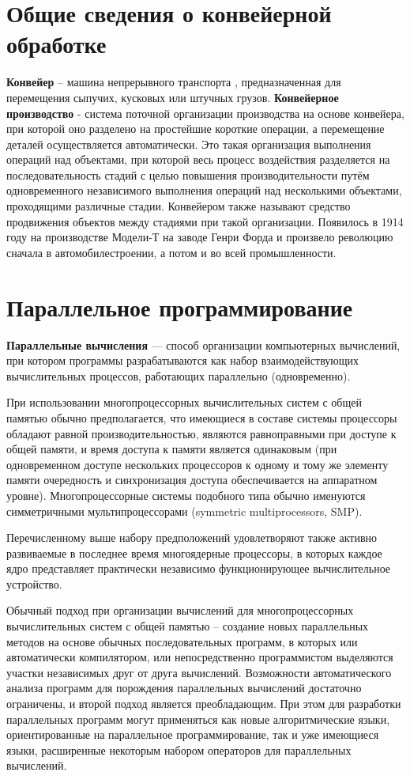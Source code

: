 \documentclass[12pt]{report}
\begin{document}
\section{Общие сведения о конвейерной обработке}
\par
\textbf{Конвейер} – машина непрерывного транспорта \cite{mednov}, предназначенная для перемещения сыпучих, кусковых или штучных грузов.
\newline
\textbf{Конвейерное производство} - система поточной организации производства на основе конвейера, при которой оно разделено на простейшие короткие операции, а перемещение деталей осуществляется автоматически. Это такая организация выполнения операций над объектами, при которой весь процесс воздействия разделяется на последовательность стадий с целью повышения производительности путём одновременного независимого выполнения операций над несколькими объектами, проходящими различные стадии. Конвейером также называют средство продвижения объектов между стадиями при такой организации\cite{wiki}. Появилось в 1914 году на производстве Модели-Т на заводе Генри Форда\cite{ford} и произвело революцию сначала в автомобилестроении, а потом и во всей промышленности.

\section{Параллельное программирование}
\textbf{Параллельные вычисления} — способ организации компьютерных вычислений, при котором программы разрабатываются как набор взаимодействующих вычислительных процессов, работающих параллельно (одновременно). 

При использовании многопроцессорных вычислительных систем с общей памятью обычно предполагается, что имеющиеся в составе системы процессоры обладают равной производительностью, являются равноправными при доступе к общей памяти, и время доступа к памяти является одинаковым (при одновременном доступе нескольких процессоров к одному и тому же элементу памяти очередность и синхронизация доступа обеспечивается на аппаратном уровне). Многопроцессорные системы подобного типа обычно именуются симметричными мультипроцессорами (symmetric multiprocessors, SMP).

Перечисленному выше набору предположений удовлетворяют также активно развиваемые в последнее время многоядерные процессоры, в которых каждое ядро представляет практически независимо функционирующее вычислительное устройство.

Обычный подход при организации вычислений для многопроцессорных вычислительных систем с общей памятью – создание новых параллельных методов на основе обычных последовательных программ, в которых или автоматически компилятором, или непосредственно программистом выделяются участки независимых друг от друга вычислений. Возможности автоматического анализа программ для порождения параллельных вычислений достаточно ограничены, и второй подход является преобладающим. При этом для разработки параллельных программ могут применяться как новые алгоритмические языки, ориентированные на параллельное программирование, так и уже имеющиеся языки, расширенные некоторым набором операторов для параллельных вычислений.
\end{document}
